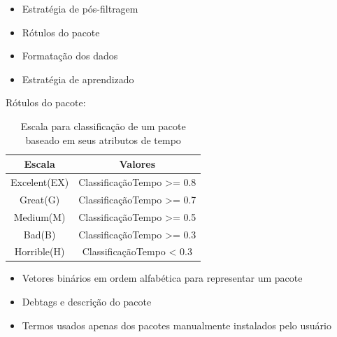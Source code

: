 \begin{frame}

    \begin{itemize}
        \item Estratégia de pós-filtragem
        \item Rótulos do pacote
        \item Formatação dos dados
        \item Estratégia de aprendizado
    \end{itemize}

\end{frame}

\begin{frame}

    Rótulos do pacote:
    \newline
    \newline

    \begin{table}[h]
    \centering
    \begin{tabular}{cc}
    \hline
    \rowcolor[HTML]{EFEFEF}
    {Escala} & {Valores} \\ \hline
    {Excelent(EX)}  & ClassificaçãoTempo >= 0.8                  \\ \hline
    {Great(G)}   & ClassificaçãoTempo >= 0.7                  \\ \hline
    {Medium(M)}   & ClassificaçãoTempo >= 0.5                  \\ \hline
    {Bad(B)}   & ClassificaçãoTempo >= 0.3                  \\ \hline
    {Horrible(H)}   &ClassificaçãoTempo < 0.3                   \\ \hline
    \end{tabular}
    \caption{Escala para classificação de um pacote baseado em seus atributos de tempo}
    \label{tab:classificacao_pacotes}
    \end{table}

\end{frame}

\begin{frame}

    \begin{itemize}
        \item Vetores binários em ordem alfabética para representar um pacote
        \item Debtags e descrição do pacote
        \item Termos usados apenas dos pacotes manualmente instalados pelo
              usuário
    \end{itemize}
\end{frame}

